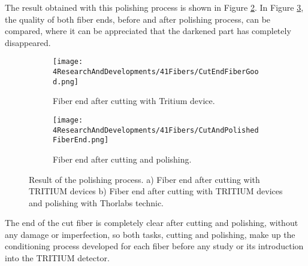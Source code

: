 The result obtained with this polishing process is shown in Figure \ref{subfig:PolishFiberEnd}. In Figure \ref{fig:ResultofPolishingProcess}, the quality of both fiber ends, before and after polishing process, can be compared, where it can be appreciated that the darkened part has completely disappeared. 

\begin{figure}
\centering
    \begin{subfigure}[b]{0.5\textwidth}
    \centering
    \texttt{[image: 4ResearchAndDevelopments/41Fibers/CutEndFiberGood.png]}  
    \caption{Fiber end after cutting with Tritium device.\label{subfig:CutFiberEnd}}
    \end{subfigure}
    \hfill
    \begin{subfigure}[b]{0.45\textwidth}
    \centering
    \texttt{[image: 4ResearchAndDevelopments/41Fibers/CutAndPolishedFiberEnd.png]}  
    \caption{Fiber end after cutting and polishing.\label{subfig:PolishFiberEnd}}
    \end{subfigure}
 \caption{Result of the polishing process. a) Fiber end after cutting with TRITIUM devices b) Fiber end after cutting with TRITIUM devices and polishing with Thorlabs technic.}
 \label{fig:ResultofPolishingProcess}
\end{figure}

The end of the cut fiber is completely clear after cutting and polishing, without any damage or imperfection, so both tasks, cutting and polishing,  make up the conditioning process developed for each fiber before any study or its introduction into the TRITIUM detector.